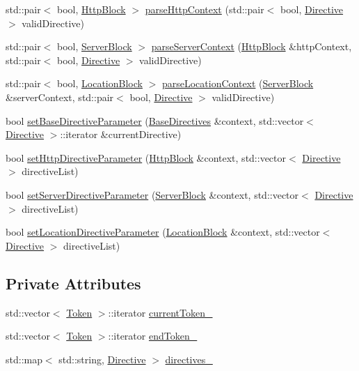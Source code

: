 \begin{DoxyCompactItemize}
\item 
std\+::pair$<$ bool, \hyperlink{classft_1_1_http_block}{Http\+Block} $>$ \hyperlink{classft_1_1_parser_a17a213759b2cca8e91ca225b2e86739d}{parse\+Http\+Context} (std\+::pair$<$ bool, \hyperlink{classft_1_1_directive}{Directive} $>$ valid\+Directive)
\item 
std\+::pair$<$ bool, \hyperlink{classft_1_1_server_block}{Server\+Block} $>$ \hyperlink{classft_1_1_parser_ae53bb700e0344f7af2519a5af3ae4230}{parse\+Server\+Context} (\hyperlink{classft_1_1_http_block}{Http\+Block} \&http\+Context, std\+::pair$<$ bool, \hyperlink{classft_1_1_directive}{Directive} $>$ valid\+Directive)
\item 
std\+::pair$<$ bool, \hyperlink{classft_1_1_location_block}{Location\+Block} $>$ \hyperlink{classft_1_1_parser_a4eb83702cdd8772017f71dda995c4089}{parse\+Location\+Context} (\hyperlink{classft_1_1_server_block}{Server\+Block} \&server\+Context, std\+::pair$<$ bool, \hyperlink{classft_1_1_directive}{Directive} $>$ valid\+Directive)
\item 
bool \hyperlink{classft_1_1_parser_a9f412d172694519d0d8dd9edacd257c0}{set\+Base\+Directive\+Parameter} (\hyperlink{classft_1_1_base_directives}{Base\+Directives} \&context, std\+::vector$<$ \hyperlink{classft_1_1_directive}{Directive} $>$\+::iterator \&current\+Directive)
\item 
bool \hyperlink{classft_1_1_parser_a5d287909e4c513e20b017ba0699b0cbf}{set\+Http\+Directive\+Parameter} (\hyperlink{classft_1_1_http_block}{Http\+Block} \&context, std\+::vector$<$ \hyperlink{classft_1_1_directive}{Directive} $>$ directive\+List)
\item 
bool \hyperlink{classft_1_1_parser_a18c1b12280ce1a16246a8ba09156116f}{set\+Server\+Directive\+Parameter} (\hyperlink{classft_1_1_server_block}{Server\+Block} \&context, std\+::vector$<$ \hyperlink{classft_1_1_directive}{Directive} $>$ directive\+List)
\item 
bool \hyperlink{classft_1_1_parser_a82bee2278db1afa69bbb6eb6f192743c}{set\+Location\+Directive\+Parameter} (\hyperlink{classft_1_1_location_block}{Location\+Block} \&context, std\+::vector$<$ \hyperlink{classft_1_1_directive}{Directive} $>$ directive\+List)
\end{DoxyCompactItemize}
\subsection*{Private Attributes}
\begin{DoxyCompactItemize}
\item 
std\+::vector$<$ \hyperlink{classft_1_1_token}{Token} $>$\+::iterator \hyperlink{classft_1_1_parser_a942c5b794d108f144c5b5028aaa34cb6}{current\+Token\+\_\+}
\item 
std\+::vector$<$ \hyperlink{classft_1_1_token}{Token} $>$\+::iterator \hyperlink{classft_1_1_parser_a538ba3ab8ee1d0cef5cc3c999f3ab44c}{end\+Token\+\_\+}
\item 
std\+::map$<$ std\+::string, \hyperlink{classft_1_1_directive}{Directive} $>$ \hyperlink{classft_1_1_parser_abe21d1e60d970dd268181e79250b5399}{directives\+\_\+}
\end{DoxyCompactItemize}


